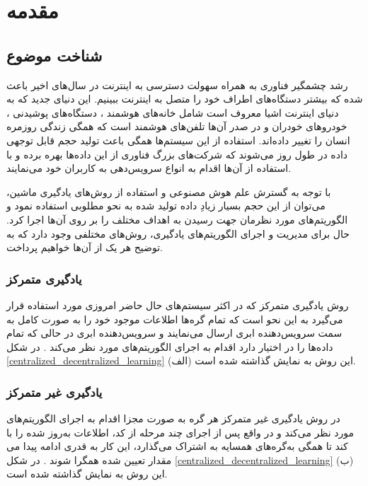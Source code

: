 \chapter{مقدمه}

\section{شناخت موضوع}

رشد چشمگیر فناوری به همراه سهولت دسترسی به اینترنت در سال‌های اخیر باعث شده که بیشتر دستگاه‌های اطراف خود را متصل به اینترنت ببینیم. این دنیای جدید که به دنیای اینترنت اشیا%
معروف است شامل خانه‌های هوشمند%
%
، دستگاه‌های پوشیدنی%
%
، خودروهای خودران و در صدر آن‌ها تلفن‌های هوشمند%
است که همگی زندگی روزمره انسان را تغییر داده‌اند. استفاده از این سیستم‌ها همگی باعث تولید حجم قابل توجهی داده در طول روز می‌شوند که شرکت‌های بزرگ فناوری از این داده‌ها بهره برده و با استفاده از آن‌ها اقدام به انواع سرویس‌‌دهی به کاربران خود می‌نمایند.

با توجه به گسترش علم هوش مصنوعی و استفاده از روش‌های یادگیری ماشین، می‌توان از این حجم بسیار زیادِ داده‌ تولید شده به نحو مطلوبی استفاده نمود و الگوریتم‌های مورد نظرمان جهت رسیدن به اهداف مختلف را بر روی آن‌ها اجرا کرد. حال برای مدیریت و اجرای الگوریتم‌های یادگیری، روش‌های مختلفی وجود دارد که به توضیح هر یک از آن‌ها خواهیم پرداخت.

\subsection{یادگیری متمرکز}
روش یادگیری متمرکز%
که در اکثر سیستم‌های حال حاضر امروزی مورد استفاده قرار می‌گیرد به این نحو است که تمام  گره‌ها%
اطلاعات موجود خود را به صورت کامل به سمت سرویس‌دهنده ابری%
ارسال می‌نمایند و سرویس‌دهنده ابری در حالی که تمام داده‌ها را در اختیار دارد اقدام به اجرای الگوریتم‌های مورد نظر می‌کند
\cite{elbir2022family}%
. در شکل
\ref{centralized_decentralized_learning}%
(الف) این روش به نمایش گذاشته شده است.


\subsection{یادگیری غیر متمرکز}
در روش یادگیری غیر متمرکز%
هر گره به صورت مجزا اقدام به اجرای الگوریتم‌های مورد نظر می‌کند و در واقع پس از اجرای چند مرحله از کد، اطلاعات به‌روز شده را با گره‌های همسایه به اشتراک می‌گذارد، این کار به قدری ادامه پیدا می‌‎کند تا همگی به مقدار تعیین شده همگرا شوند
\cite{zhou2019edge}%
. در شکل
\ref{centralized_decentralized_learning}%
(ب) این روش به نمایش گذاشته شده است.



